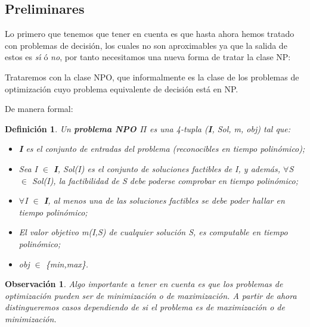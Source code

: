 \documentclass[a4paper,12pt,titlepage]{article}
\newtheorem{defi}{Definici\'on}[section]
\newtheorem{obs}{Observaci\'on}[section]
\begin{document}
\subsection{Preliminares}

Lo primero que tenemos que tener en cuenta es que hasta ahora hemos tratado con problemas de decisi\'on, los cuales no son aproximables ya que la salida de estos es \textit{s\'\i} ó \textit{no}, por tanto necesitamos una nueva forma de tratar la clase NP:

Trataremos con la clase NPO, que informalmente es la clase de los problemas de optimizaci\'on cuyo problema equivalente de decisi\'on est\'a en NP.

De manera formal:

\begin{defi}

Un \textbf{problema NPO $\Pi$} es una 4-tupla (\textbf{I}, Sol, m, obj) tal que:

\begin{itemize}

\item \textbf{I} es el conjunto de entradas del problema (reconocibles en tiempo polin\'omico);

\item Sea I $\in$ \textbf{I}, Sol(I) es el conjunto de soluciones factibles de I, y adem\'as, $\forall$S $\in$ Sol(I), la factibilidad de S debe poderse comprobar en tiempo polin\'omico;

\item $\forall$I $\in$ \textbf{I}, al menos una de las soluciones factibles se debe poder hallar en tiempo polin\'omico;

\item El valor objetivo m(I,S) de cualquier soluci\'on S, es computable en tiempo polin\'omico;

\item obj $\in$ \{min,max\}.

\end{itemize}

\end{defi}

\begin{obs}

Algo importante a tener en cuenta es que los problemas de optimizaci\'on pueden ser de minimizaci\'on o de maximizaci\'on. A partir de ahora distingueremos casos dependiendo de si el problema es de maximizaci\'on o de minimizaci\'on.

\end{obs}
\end{document}

